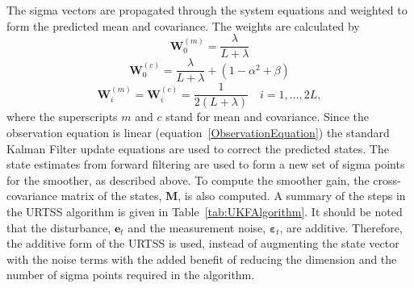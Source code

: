 \documentclass[10pt]{article}
\begin{document}
The sigma vectors are propagated through the system equations and weighted to form the predicted mean and covariance. The weights are calculated by 
\begin{equation}
	\mathbf W_0^{(m)}=\frac{\lambda}{ L+\lambda} 
\end{equation}
\begin{equation}
	\mathbf W_0^{(c)}=\frac{\lambda}{ L+\lambda}+(1-\alpha^2+\beta) 
\end{equation}
\begin{equation}
	\mathbf W_i^{(m)}=\mathbf W_i^{(c)}=\frac{1}{2( L+\lambda)} \quad i=1, \dots, 2L, 
\end{equation}
where the superscripts $m$ and $c$ stand for mean and covariance. Since the observation equation is linear (equation~\ref{ObservationEquation}) the standard Kalman Filter update equations are used to correct the predicted states. The state estimates from forward filtering are used to form a new set of sigma points for the smoother, as described above. To compute the smoother gain, the cross-covariance matrix of the states, $\mathbf M$, is also computed. A summary of the steps in the URTSS algorithm is given in Table~\ref{tab:UKFAlgorithm}. It should be noted that the disturbance, $\mathbf{e}_t$ and the measurement noise, $\boldsymbol{\varepsilon}_t$, are additive. Therefore, the additive form of the URTSS is used, instead of augmenting the state vector with the noise terms with the added benefit of reducing the dimension and the number of sigma points required in the algorithm.
\end{document}
